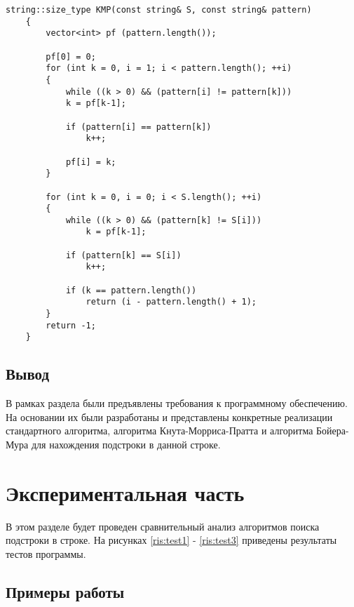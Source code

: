 \documentclass[a4paper,12pt]{report}
\begin{document}
	        \begin{lstlisting}[frame = single, breaklines, label = list:kmp, caption = Алгоритм Кнута-Морриса-Пратта]
	string::size_type KMP(const string& S, const string& pattern)
	{
	    vector<int> pf (pattern.length());
	
	    pf[0] = 0;
	    for (int k = 0, i = 1; i < pattern.length(); ++i)
	    {
	        while ((k > 0) && (pattern[i] != pattern[k]))
	        k = pf[k-1];
	
	        if (pattern[i] == pattern[k])
	            k++;
	
	        pf[i] = k;
	    }
	
	    for (int k = 0, i = 0; i < S.length(); ++i)
	    {
	        while ((k > 0) && (pattern[k] != S[i]))
	            k = pf[k-1];
	
	        if (pattern[k] == S[i])
	            k++;
	
	        if (k == pattern.length())
	            return (i - pattern.length() + 1);
	    }
	    return -1;
	}
	        \end{lstlisting}
	      
	\section{Вывод}
	
		В рамках раздела были предъявлены требования к программному обеспечению. 
		На основании их были разработаны и представлены конкретные реализации стандартного алгоритма, алгоритма Кнута-Морриса-Пратта и алгоритма Бойера-Мура для нахождения подстроки в данной строке.      
	        
    \newpage

    \chapter{Экспериментальная часть}
        \label{sec:experimental_part}

			В этом разделе будет проведен сравнительный анализ алгоритмов поиска подстроки в строке. 
			На рисунках \ref{ris:test1} - \ref{ris:test3} приведены результаты тестов программы.

	\section{Примеры работы}
%
	
\end{document}
